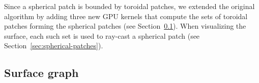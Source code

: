 Since a spherical patch is bounded by toroidal patches, we extended the original algorithm by adding three new GPU kernels that compute the sets of toroidal patches forming the spherical patches (see Section~\ref{sec:graph}).
When visualizing the surface, each such set is used to ray-cast a spherical patch (see Section~\ref{sec:spherical-patches}).


\subsection{Surface graph}
\label{sec:graph}
   

